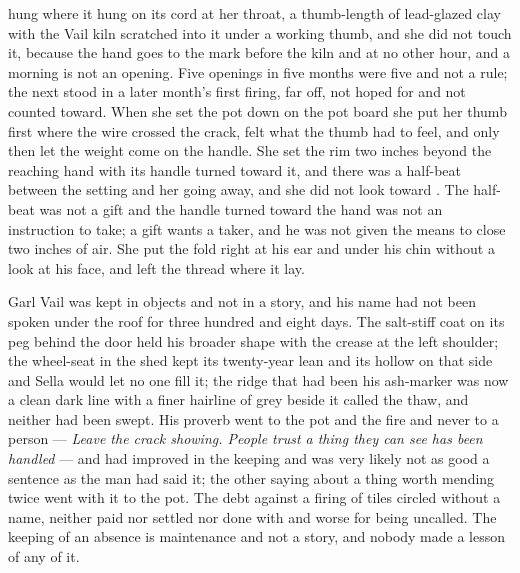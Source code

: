  hung where it hung on its cord at her throat, a thumb-length of lead-glazed clay with the Vail kiln scratched into it under a working thumb, and she did not touch it, because the hand goes to the mark before the kiln and at no other hour, and a morning is not an opening. Five openings in five months were five and not a rule; the next stood in a later month's first firing, far off, not hoped for and not counted toward. When she set the pot down on the pot board she put her thumb first where the wire crossed the crack, felt what the thumb had to feel, and only then let the weight come on the handle. She set the rim two inches beyond the reaching hand with its handle turned toward it, and there was a half-beat between the setting and her going away, and she did not look toward . The half-beat was not a gift and the handle turned toward the hand was not an instruction to take; a gift wants a taker, and he was not given the means to close two inches of air. She put the fold right at his ear and under his chin without a look at his face, and left the thread where it lay.

Garl Vail was kept in objects and not in a story, and his name had not been spoken under the roof for three hundred and eight days. The salt-stiff coat on its peg behind the door held his broader shape with the crease at the left shoulder; the wheel-seat in the shed kept its twenty-year lean and its hollow on that side and Sella would let no one fill it; the ridge that had been his ash-marker was now a clean dark line with a finer hairline of grey beside it called the thaw, and neither had been swept. His proverb went to the pot and the fire and never to a person --- \emph{Leave the crack showing. People trust a thing they can see has been handled} --- and had improved in the keeping and was very likely not as good a sentence as the man had said it; the other saying about a thing worth mending twice went with it to the pot. The debt against a firing of tiles circled without a name, neither paid nor settled nor done with and worse for being uncalled. The keeping of an absence is maintenance and not a story, and nobody made a lesson of any of it.

